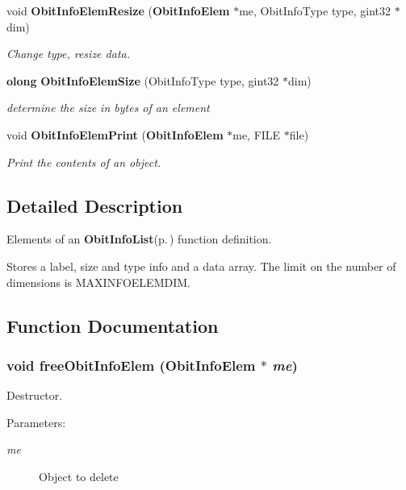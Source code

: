\begin{CompactItemize}
void {\bf Obit\-Info\-Elem\-Resize} ({\bf Obit\-Info\-Elem} $\ast$me, Obit\-Info\-Type type, gint32 $\ast$dim)
\begin{CompactList}\small\item\em Change type, resize data. \item\end{CompactList}\item 
{\bf olong} {\bf Obit\-Info\-Elem\-Size} (Obit\-Info\-Type type, gint32 $\ast$dim)
\begin{CompactList}\small\item\em determine the size in bytes of an element \item\end{CompactList}\item 
void {\bf Obit\-Info\-Elem\-Print} ({\bf Obit\-Info\-Elem} $\ast$me, FILE $\ast$file)
\begin{CompactList}\small\item\em Print the contents of an object. \item\end{CompactList}\end{CompactItemize}


\subsection{Detailed Description}
Elements of an {\bf Obit\-Info\-List}{\rm (p.\,\pageref{structObitInfoList})} function definition. 

Stores a label, size and type info and a data array. The limit on the number of dimensions is MAXINFOELEMDIM.

\subsection{Function Documentation}
\subsubsection{\setlength{\rightskip}{0pt plus 5cm}void free\-Obit\-Info\-Elem ({\bf Obit\-Info\-Elem} $\ast$ {\em me})}\label{ObitInfoElem_8c_a2}


Destructor. 

\begin{Desc}
\item[Parameters:]
\begin{description}
\item[{\em me}]Object to delete \end{description}
\end{Desc}
